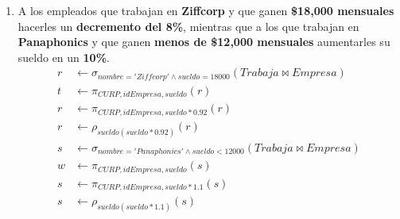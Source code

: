 \documentclass{article}
\begin{document}
\begin{enumerate}
{{\begin{enumerate}
{\begin{align*}
                            r &\leftarrow (\pi_{idEmpresa,nombre}(r) \bowtie cte)\\
                            Empresa &\leftarrow Empresa \cup r\\
                            cte &\leftarrow \pi_{CURP,ciudad}(cte \bowtie Trabaja)\\
                            em &\leftarrow \rho_{ciudadOld(ciudad)}(Empleado)\\
                            em &\leftarrow \pi_{CURP,nombre,calle}(em \bowtie t)\\
                            cte &\leftarrow (cte \bowtie em)\\
                            Empleado &\leftarrow Empleado - (t \bowtie Empleado)\\
                            Empleado &\leftarrow Empleado \cup cte\\
                         \end{align*}
                    }
                    \item {
                        A los empleados que trabajan en \textbf{Ziffcorp} y que
                        ganen \textbf{\$18,000 mensuales} hacerles un
                        \textbf{decremento del 8\%}, mientras que a los que
                        trabajan en \textbf{Panaphonics} y que ganen 
                        \textbf{menos de \$12,000 mensuales} aumentarles su
                        sueldo en un \textbf{10\%}.
                         \begin{align*}
                         r & \leftarrow \sigma_{nombre = 'Ziffcorp' \wedge sueldo = 18 000 }(Trabaja \bowtie Empresa)\\
                         t & \leftarrow \pi_{CURP,idEmpresa,sueldo}(r)\\
                         r & \leftarrow \pi_{CURP,idEmpresa,sueldo*0.92}(r)\\
                         r & \leftarrow \rho_{sueldo(sueldo*0.92)}(r)\\
                         s & \leftarrow \sigma_{nombre = 'Panaphonics' \wedge sueldo < 12 000 }(Trabaja \bowtie Empresa)\\
                         w & \leftarrow \pi_{CURP,idEmpresa,sueldo}(s)\\
                         s & \leftarrow \pi_{CURP,idEmpresa,sueldo*1.1}(s)\\
                         s & \leftarrow \rho_{sueldo(sueldo*1.1)}(s)\\

\end{align*}}
\end{enumerate}}}
\end{enumerate}
\end{document}
